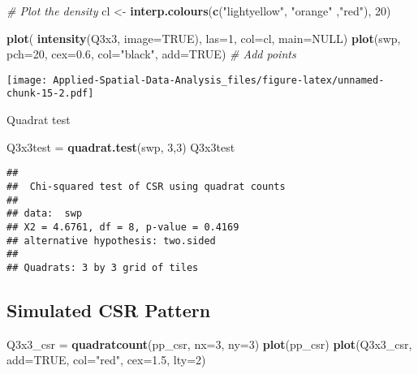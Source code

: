 \documentclass[
]{book}
\newenvironment{Shaded}{\begin{snugshade}}{\end{snugshade}}
\newcommand{\CommentTok}[1]{\textcolor[rgb]{0.56,0.35,0.01}{\textit{#1}}}
\newcommand{\DataTypeTok}[1]{\textcolor[rgb]{0.13,0.29,0.53}{#1}}
\newcommand{\DecValTok}[1]{\textcolor[rgb]{0.00,0.00,0.81}{#1}}
\newcommand{\FloatTok}[1]{\textcolor[rgb]{0.00,0.00,0.81}{#1}}
\newcommand{\KeywordTok}[1]{\textcolor[rgb]{0.13,0.29,0.53}{\textbf{#1}}}
\newcommand{\NormalTok}[1]{#1}
\newcommand{\OtherTok}[1]{\textcolor[rgb]{0.56,0.35,0.01}{#1}}
\newcommand{\StringTok}[1]{\textcolor[rgb]{0.31,0.60,0.02}{#1}}
\begin{document}
\begin{Shaded}
\begin{Highlighting}[]
\CommentTok{# Plot the density}
\NormalTok{cl <-}\StringTok{  }\KeywordTok{interp.colours}\NormalTok{(}\KeywordTok{c}\NormalTok{(}\StringTok{"lightyellow"}\NormalTok{, }\StringTok{"orange"}\NormalTok{ ,}\StringTok{"red"}\NormalTok{), }\DecValTok{20}\NormalTok{)}

\KeywordTok{plot}\NormalTok{( }\KeywordTok{intensity}\NormalTok{(Q3x3, }\DataTypeTok{image=}\OtherTok{TRUE}\NormalTok{), }\DataTypeTok{las=}\DecValTok{1}\NormalTok{, }\DataTypeTok{col=}\NormalTok{cl, }\DataTypeTok{main=}\OtherTok{NULL}\NormalTok{)}
\KeywordTok{plot}\NormalTok{(swp, }\DataTypeTok{pch=}\DecValTok{20}\NormalTok{, }\DataTypeTok{cex=}\FloatTok{0.6}\NormalTok{, }\DataTypeTok{col=}\StringTok{"black"}\NormalTok{, }\DataTypeTok{add=}\OtherTok{TRUE}\NormalTok{)  }\CommentTok{# Add points}
\end{Highlighting}
\end{Shaded}

\texttt{[image: Applied-Spatial-Data-Analysis\_files/figure-latex/unnamed-chunk-15-2.pdf]}

Quadrat test

\begin{Shaded}
\begin{Highlighting}[]
\NormalTok{Q3x3test =}\StringTok{ }\KeywordTok{quadrat.test}\NormalTok{(swp, }\DecValTok{3}\NormalTok{,}\DecValTok{3}\NormalTok{)}
\NormalTok{Q3x3test}
\end{Highlighting}
\end{Shaded}

\begin{verbatim}
## 
## 	Chi-squared test of CSR using quadrat counts
## 
## data:  swp
## X2 = 4.6761, df = 8, p-value = 0.4169
## alternative hypothesis: two.sided
## 
## Quadrats: 3 by 3 grid of tiles
\end{verbatim}

\hypertarget{simulated-csr-pattern}{%
\subsection{Simulated CSR Pattern}\label{simulated-csr-pattern}}

\begin{Shaded}
\begin{Highlighting}[]
\NormalTok{Q3x3_csr =}\StringTok{ }\KeywordTok{quadratcount}\NormalTok{(pp_csr, }\DataTypeTok{nx=}\DecValTok{3}\NormalTok{, }\DataTypeTok{ny=}\DecValTok{3}\NormalTok{)}
\KeywordTok{plot}\NormalTok{(pp_csr)}
\KeywordTok{plot}\NormalTok{(Q3x3_csr, }\DataTypeTok{add=}\OtherTok{TRUE}\NormalTok{, }\DataTypeTok{col=}\StringTok{"red"}\NormalTok{, }\DataTypeTok{cex=}\FloatTok{1.5}\NormalTok{, }\DataTypeTok{lty=}\DecValTok{2}\NormalTok{)}
\end{Highlighting}
\end{Shaded}
\end{document}
